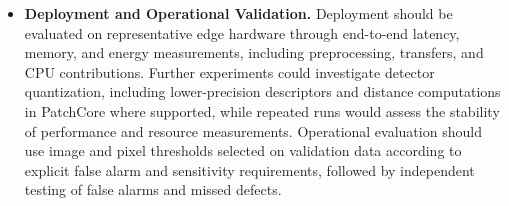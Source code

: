 \begin{itemize}
      \item \textbf{Deployment and Operational Validation.}
            Deployment should be evaluated on representative edge hardware through end-to-end latency, memory, and energy measurements, including preprocessing, transfers, and CPU contributions. Further experiments could investigate detector quantization, including lower-precision descriptors and distance computations in PatchCore where supported, while repeated runs would assess the stability of performance and resource measurements. Operational evaluation should use image and pixel thresholds selected on validation data according to explicit false alarm and sensitivity requirements, followed by independent testing of false alarms and missed defects.

\end{itemize}
